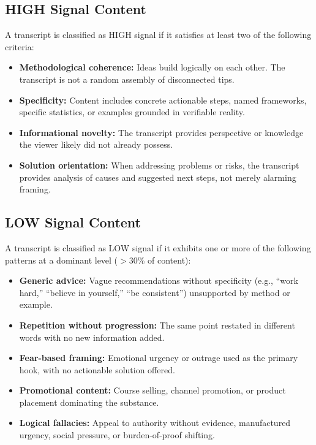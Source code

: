 \documentclass[11pt,a4paper]{article}
\begin{document}
\subsection{HIGH Signal Content}

A transcript is classified as HIGH signal if it satisfies at least two of the following criteria:
\begin{itemize}
  \item \textbf{Methodological coherence:} Ideas build logically on each other. The transcript
  is not a random assembly of disconnected tips.
  \item \textbf{Specificity:} Content includes concrete actionable steps, named frameworks,
  specific statistics, or examples grounded in verifiable reality.
  \item \textbf{Informational novelty:} The transcript provides perspective or knowledge the
  viewer likely did not already possess.
  \item \textbf{Solution orientation:} When addressing problems or risks, the transcript
  provides analysis of causes and suggested next steps, not merely alarming framing.
\end{itemize}

\subsection{LOW Signal Content}

A transcript is classified as LOW signal if it exhibits one or more of the following patterns
at a dominant level ($>$30\% of content):
\begin{itemize}
  \item \textbf{Generic advice:} Vague recommendations without specificity (e.g., ``work hard,''
  ``believe in yourself,'' ``be consistent'') unsupported by method or example.
  \item \textbf{Repetition without progression:} The same point restated in different words with
  no new information added.
  \item \textbf{Fear-based framing:} Emotional urgency or outrage used as the primary hook,
  with no actionable solution offered.
  \item \textbf{Promotional content:} Course selling, channel promotion, or product placement
  dominating the substance.
  \item \textbf{Logical fallacies:} Appeal to authority without evidence, manufactured urgency,
  social pressure, or burden-of-proof shifting.
\end{itemize}
\end{document}
